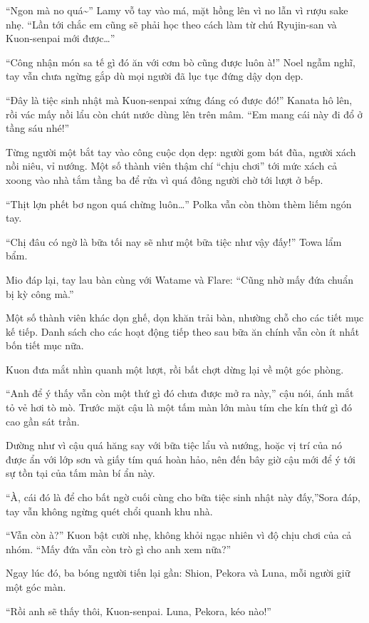 \documentclass[../main.tex]{subfiles}
\begin{document}
``Ngon mà no quá\~{}'' Lamy vỗ tay vào má, mặt hồng lên vì no lẫn vì rượu sake nhẹ. ``Lần tới chắc em cũng sẽ phải học theo cách làm từ chú Ryujin-san và Kuon-senpai mới được\dots''

``Công nhận món sa tế gì đó ăn với cơm bò cũng được luôn à!'' Noel ngẫm nghĩ, tay vẫn chưa ngừng gắp dù mọi người đã lục tục đứng dậy dọn dẹp.

``Đây là tiệc sinh nhật mà Kuon-senpai xứng đáng có được đó!'' Kanata hô lên, rồi vác mấy nồi lẩu còn chút nước dùng lên trên mâm. ``Em mang cái này đi đổ ở tầng sáu nhé!''

Từng người một bắt tay vào công cuộc dọn dẹp: người gom bát đũa, người xách nồi niêu, vỉ nướng. Một số thành viên thậm chí ``chịu chơi'' tới mức xách cả xoong vào nhà tắm tầng ba để rửa vì quá đông người chờ tới lượt ở bếp.

``Thịt lợn phết bơ ngon quá chừng luôn\dots'' Polka vẫn còn thòm thèm liếm ngón tay.

``Chị đâu có ngờ là bữa tối nay sẽ như một bữa tiệc như vậy đấy!'' Towa lẩm bẩm.

Mio đáp lại, tay lau bàn cùng với Watame và Flare: ``Cũng nhờ mấy đứa chuẩn bị kỳ công mà.''

Một số thành viên khác dọn ghế, dọn khăn trải bàn, nhường chỗ cho các tiết mục kế tiếp. Danh sách cho các hoạt động tiếp theo sau bữa ăn chính vẫn còn ít nhất bốn tiết mục nữa.

Kuon đưa mắt nhìn quanh một lượt, rồi bất chợt dừng lại về một góc phòng.

``Anh để ý thấy vẫn còn một thứ gì đó chưa được mở ra này,'' cậu nói, ánh mắt tỏ vẻ hơi tò mò. Trước mặt cậu là một tấm màn lớn màu tím che kín thứ gì đó cao gần sát trần.

Dường như vì cậu quá hăng say với bữa tiệc lẩu và nướng, hoặc vị trí của nó được ẩn với lớp sơn và giấy tím quá hoàn hảo, nên đến bây giờ cậu mới để ý tới sự tồn tại của tấm màn bí ẩn này.

``À, cái đó là để cho bất ngờ cuối cùng cho bữa tiệc sinh nhật này đấy,''Sora đáp, tay vẫn không ngừng quét chổi quanh khu nhà.

``Vẫn còn à?'' Kuon bật cười nhẹ, không khỏi ngạc nhiên vì độ chịu chơi của cả nhóm. ``Mấy đứa vẫn còn trò gì cho anh xem nữa?''

Ngay lúc đó, ba bóng người tiến lại gần: Shion, Pekora và Luna, mỗi người giữ một góc màn.

``Rồi anh sẽ thấy thôi, Kuon-senpai. Luna, Pekora, kéo nào!''
\end{document}
